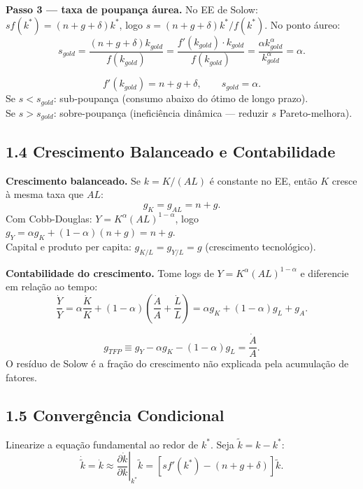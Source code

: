 \documentclass[12pt, a4paper]{article}
\begin{document}
\textbf{Passo 3 --- taxa de poupança áurea.} No EE de Solow: $sf(k^*) = (n+g+\delta)k^*$, logo $s = (n+g+\delta)k^*/f(k^*)$. No ponto áureo:
\[
s_{gold} = \frac{(n+g+\delta)k_{gold}}{f(k_{gold})} = \frac{f'(k_{gold})\cdot k_{gold}}{f(k_{gold})} = \frac{\alpha k_{gold}^\alpha}{k_{gold}^\alpha} = \alpha.
\]

\begin{resultbox}[title={Regra de Ouro de Solow}]
\[
f'(k_{gold}) = n+g+\delta, \qquad s_{gold} = \alpha.
\]
Se $s < s_{gold}$: sub-poupança (consumo abaixo do ótimo de longo prazo).\\
Se $s > s_{gold}$: sobre-poupança (ineficiência dinâmica --- reduzir $s$ Pareto-melhora).
\end{resultbox}

\subsection*{1.4 Crescimento Balanceado e Contabilidade}

\textbf{Crescimento balanceado.} Se $k = K/(AL)$ é constante no EE, então $K$ cresce à mesma taxa que $AL$:
\[
g_K = g_{AL} = n + g.
\]
Com Cobb-Douglas: $Y = K^\alpha(AL)^{1-\alpha}$, logo $g_Y = \alpha g_K + (1-\alpha)(n+g) = n+g$.\\
Capital e produto per capita: $g_{K/L} = g_{Y/L} = g$ (crescimento tecnológico).

\textbf{Contabilidade do crescimento.} Tome logs de $Y = K^\alpha(AL)^{1-\alpha}$ e diferencie em relação ao tempo:
\[
\frac{\dot{Y}}{Y} = \alpha\frac{\dot{K}}{K} + (1-\alpha)\left(\frac{\dot{A}}{A} + \frac{\dot{L}}{L}\right)
= \alpha g_K + (1-\alpha)g_L + g_A.
\]

\begin{resultbox}[title={Contabilidade do Crescimento (Resíduo de Solow)}]
\[
g_{TFP} \equiv g_Y - \alpha g_K - (1-\alpha)g_L = \frac{\dot{A}}{A}.
\]
O resíduo de Solow é a fração do crescimento não explicada pela acumulação de fatores.
\end{resultbox}

\subsection*{1.5 Convergência Condicional}

Linearize a equação fundamental ao redor de $k^*$. Seja $\tilde{k} = k - k^*$:
\[
\dot{\tilde{k}} = \dot{k} \approx \left.\frac{\partial\dot{k}}{\partial k}\right|_{k^*}\tilde{k} = \left[sf'(k^*) - (n+g+\delta)\right]\tilde{k}.
\]
\end{document}
